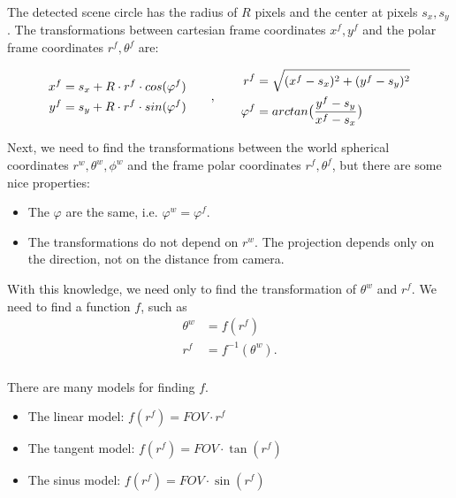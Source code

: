 \documentclass[a4paper,12pt,titlepage]{article}
\numberwithin{figure}{section}
\begin{document}
The detected scene circle has the radius of $R$ pixels and the center at pixels $s_x, s_y$. The transformations between cartesian frame coordinates $x^f, y^f$ and the polar frame coordinates $r^f, \theta^f$ are:

\begin{equation*}
\begin{aligned}[c]
x^f &= s_x + R \cdot r^f \cdot cos(\varphi^f) \\
y^f &= s_y + R \cdot r^f \cdot sin(\varphi^f) \\
\end{aligned}
\qquad,\qquad
\begin{aligned}[c]
r^f &= \sqrt{(x^f - s_x)^2 + (y^f - s_y)^2} \\
\varphi^f &= arctan\big{(}\frac{y^f - s_y}{x^f - s_x}\big{)}
\end{aligned}
\end{equation*}

Next, we need to find the transformations between the world spherical coordinates $r^w, \theta^w, \phi^w$ and the frame polar coordinates $r^f, \theta^f$, but there are some nice properties:

\begin{itemize}
\item The $\varphi$ are the same, i.e. $\varphi^w = \varphi^f$.
\item The transformations do not depend on $r^w$. The projection depends only on the direction, not on the distance from camera.
\end{itemize}

With this knowledge, we need only to find the transformation of $\theta^w$ and $r^f$. We need to find a function $f$, such as 
\begin{equation}
\begin{aligned}
\theta^w &= f(r^f) \\
r^f &= f^{-1}(\theta^w). \\
\end{aligned}
\end{equation}

There are many models for finding $f$. 

\begin{itemize}
\item The linear model: $f(r^f) = FOV \cdot r^f$
\item The tangent model: $f(r^f) = FOV \cdot \tan(r^f)$
\item The sinus model: $f(r^f) = FOV \cdot \sin(r^f)$
\end{itemize}
\end{document}
